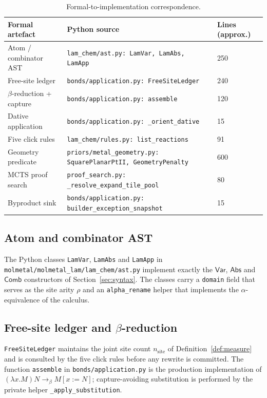 \documentclass{article}
\theoremstyle{definition}
\newcommand{\stepstoBeta}{\longrightarrow_{\beta}}
\begin{document}
\begin{table}[h]
\centering
\small
\begin{tabular}{lll}
\hline
\textbf{Formal artefact} & \textbf{Python source} & \textbf{Lines (approx.)} \\
\hline
Atom / combinator AST          & \texttt{lam\_chem/ast.py: LamVar, LamAbs, LamApp} & 250 \\
Free-site ledger               & \texttt{bonds/application.py: FreeSiteLedger}    & 240 \\
$\beta$-reduction + capture     & \texttt{bonds/application.py: assemble}          & 120 \\
Dative application             & \texttt{bonds/application.py: \_orient\_dative}  &  15 \\
Five click rules               & \texttt{lam\_chem/rules.py: list\_reactions}      &  91 \\
Geometry predicate             & \texttt{priors/metal\_geometry.py: SquarePlanarPtII, GeometryPenalty} & 600 \\
MCTS proof search              & \texttt{proof\_search.py: \_resolve\_expand\_tile\_pool} &  80 \\
Byproduct sink                 & \texttt{bonds/application.py: builder\_exception\_snapshot} &  15 \\
\hline
\end{tabular}
\caption{Formal-to-implementation correspondence.}
\label{tab:impl}
\end{table}

\subsection{Atom and combinator AST}
The Python classes \texttt{LamVar}, \texttt{LamAbs} and \texttt{LamApp} in
\texttt{molmetal/molmetal\_lam/lam\_chem/ast.py} implement exactly the
$\mathsf{Var}$, $\mathsf{Abs}$ and $\mathsf{Comb}$ constructors of
Section~\ref{sec:syntax}. The classes carry a \texttt{domain} field that
serves as the site arity $\rho$ and an \texttt{alpha\_rename} helper that
implements the $\alpha$-equivalence of the calculus.

\subsection{Free-site ledger and $\beta$-reduction}
\texttt{FreeSiteLedger} maintains the joint site count
$n_{\text{site}}$ of Definition~\ref{def:measure} and is consulted by the
five click rules before any rewrite is committed. The function
\texttt{assemble} in \texttt{bonds/application.py} is the production
implementation of $(\lambda x.M)N \stepstoBeta M[x:=N]$; capture-avoiding
substitution is performed by the private helper \texttt{\_apply\_substitution}.
\end{document}
